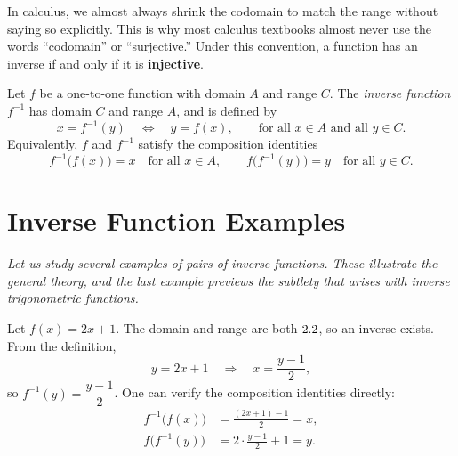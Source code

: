 \begin{remark}
In calculus, we almost always shrink the codomain to match the range without saying so explicitly.  This is why most calculus textbooks almost never use the words ``codomain'' or ``surjective.''  Under this convention, a function has an inverse if and only if it is \textbf{injective}.
\end{remark}

\begin{definition}
\label{def:4-6}
Let $f$ be a one-to-one function with domain $A$ and range $C$.  The \emph{inverse function} $f^{-1}$ has domain $C$ and range $A$, and is defined by
\[
  x = f^{-1}(y) \quad \Longleftrightarrow \quad y = f(x),
  \qquad \text{for all } x \in A \text{ and all } y \in C.
\]
Equivalently, $f$ and $f^{-1}$ satisfy the composition identities
\[
  f^{-1}\!\bigl(f(x)\bigr) = x \quad \text{for all } x \in A,
  \qquad
  f\!\bigl(f^{-1}(y)\bigr) = y \quad \text{for all } y \in C.
\]
\end{definition}

\section{Inverse Function Examples}
\label{sec:4.3}

\textit{Let us study several examples of pairs of inverse functions.  These illustrate the general theory, and the last example previews the subtlety that arises with inverse trigonometric functions.}

\begin{example}
\label{ex:4-1}
Let $f(x) = 2x + 1$.  The domain and range are both $2.2$, so an inverse exists.  From the definition,
\[
  y = 2x + 1 \quad \Longrightarrow \quad x = \frac{y - 1}{2},
\]
so $f^{-1}(y) = \dfrac{y - 1}{2}$.  One can verify the composition identities directly:
\begin{align*}
  f^{-1}\!\bigl(f(x)\bigr) &= \frac{(2x + 1) - 1}{2} = x, \\
  f\!\bigl(f^{-1}(y)\bigr) &= 2 \cdot \frac{y - 1}{2} + 1 = y.
\end{align*}
\end{example}

